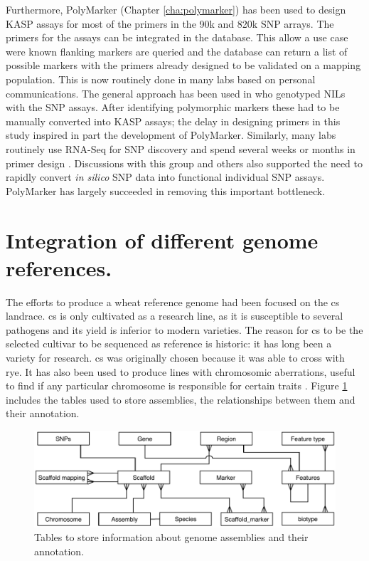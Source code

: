 Furthermore, PolyMarker (Chapter \ref{cha:polymarker}) has been used to design KASP assays for most of the primers in the 90k \citep{Wang2014} and 820k \citet{Winfield2016} SNP arrays. 
The primers for the assays can be integrated in the database. 
This allow a use case were known flanking markers are queried and the database can return a list of possible markers with the primers already designed to be validated on a mapping population. 
This is now routinely done in many labs based on personal communications. 
The general approach has been used in \citet{Simmonds2014} who genotyped NILs with the SNP assays. 
After identifying polymorphic markers these had to be manually converted into KASP assays; the delay in designing primers in this study inspired in part the development of PolyMarker. 
Similarly, many labs routinely use RNA-Seq for SNP discovery and spend several weeks or months in primer design \citep{Shatalina2013}. 
Discussions with this group and others also supported the need to rapidly convert \textit{in silico} SNP data into functional individual SNP assays. 
PolyMarker has largely succeeded in removing this important bottleneck. 

\section{Integration of different genome references. }

The efforts to produce a wheat reference genome had been focused on the \gls{cs} landrace. 
\acrshort{cs} is only cultivated as a research line, as it is susceptible to several pathogens and its yield is inferior to modern varieties.  
The reason for \acrshort{cs} to be the selected cultivar to be sequenced as reference is historic: it has long been a variety  for research.
\acrshort{cs} was originally chosen because it was able to cross with rye. 
It has also been used to produce lines with chromosomic aberrations, useful to find if any particular chromosome is responsible for certain traits \citep{Sears1985}. 
Figure \ref{fig:discussion:assemblyTables} includes the tables used to store assemblies, the relationships between them and their annotation. 

\begin{figure}
\includegraphics[width=1\textwidth]{Conclusions/Figures/assemblyTables.pdf}
\caption{Tables to store information about genome assemblies and their annotation.}
\label{fig:discussion:assemblyTables}
\end{figure}

